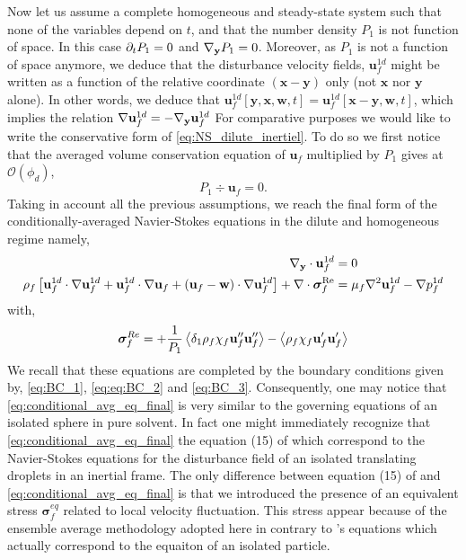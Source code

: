 Now let us assume a complete homogeneous and steady-state system such that none of the variables depend on $t$, and that the number density $P_1$ is not function of space. 
In this case $\partial_t P_1 = 0$ and ${\mathbf{\nabla}_\textbf{y}} P_1 = 0$. 
Moreover, as $P_1$ is not a function of space anymore, we deduce that the disturbance velocity fields, $\textbf{u}_f^{1d}$ might be written as a function of the relative coordinate $(\textbf{x} - \textbf{y})$ only (not $\textbf{x}$ nor $\textbf{y}$ alone). 
In other words, we deduce that $\textbf{u}_f^{1d}[\textbf{y},\textbf{x},\textbf{w},t] = \textbf{u}_f^{1d}[\textbf{x}-\textbf{y},\textbf{w},t]$, which implies the relation  $\mathbf{\nabla} \textbf{u}_f^{1d} = - {\mathbf{\nabla}_\textbf{y}} \textbf{u}^{1d}_f$
For comparative purposes we would like to write the conservative form of \ref{eq:NS_dilute_inertiel}.
To do so we first notice that the averaged volume conservation equation of $\textbf{u}_f$ multiplied by $P_1$ gives at $\mathcal{O}(\phi_d)$, 
\begin{equation*}
    P_1\div \textbf{u}_f = 0.
\end{equation*}
Taking in account all the previous assumptions, we reach the final form of the conditionally-averaged Navier-Stokes equations in the dilute and homogeneous regime namely, 
\begin{align}
    \pddy \cdot \textbf{u}^{1d}_f &= 0 \\
    \rho_f \left[
        \textbf{u}^{1d}_f\cdot \grad\textbf{u}_f^{1d} 
        +  \textbf{u}^{1d}_f\cdot \grad\textbf{u}_f 
        +  (\textbf{u}_f - \textbf{w})\cdot \grad\textbf{u}_f^{1d}
    \right]
    + \div \bm\sigma^\text{Re}_f
    &=
        \mu_f \grad^2 \textbf{u}^{1d}_f  
        - \grad p_f^{1d} 
    \label{eq:conditional_avg_eq_final}
\end{align}
with, 
\begin{equation*}
    \bm\sigma^{Re}_f
    =
    + \frac{1}{P_1}\left<\delta_1\rho_f\chi_f\textbf{u}_f''\textbf{u}_f''\right>
    - \left<\rho_f\chi_f\textbf{u}_f'\textbf{u}_f'\right>
\end{equation*}
We recall that these equations are completed by the boundary conditions given by, \ref{eq:BC_1}, \ref{eq:eq:BC_2} and \ref{eq:BC_3}.
Consequently, one may notice that \ref{eq:conditional_avg_eq_final} is very similar to the governing equations of an isolated sphere in pure solvent. 
In fact one might immediately recognize that \ref{eq:conditional_avg_eq_final} the equation (15) of \citep{maxey1983equation} which correspond to the Navier-Stokes equations for the disturbance field of an isolated translating droplets in an inertial frame. 
The only difference between equation (15) of \citep{maxey1983equation} and \ref{eq:conditional_avg_eq_final} is that we introduced the presence of an equivalent stress $\bm\sigma_f^{eq}$ related to local velocity fluctuation. 
This stress appear because of the ensemble average methodology adopted here in contrary to \citep{maxey1983equation}'s equations which actually correspond to the equaiton of an isolated particle. 




